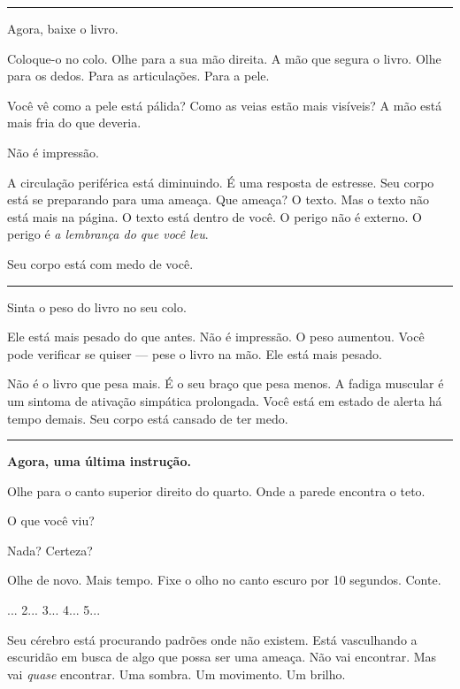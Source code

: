 \vspace{0.5em}\noindent\rule{\textwidth}{0.5pt}\vspace{0.5em}

\noindent Agora, baixe o livro.

\noindent Coloque-o no colo. Olhe para a sua mão direita. A mão que segura o livro. Olhe para os dedos. Para as articulações. Para a pele.

\noindent Você vê como a pele está pálida? Como as veias estão mais visíveis? A mão está mais fria do que deveria.

\noindent Não é impressão.

\noindent A circulação periférica está diminuindo. É uma resposta de estresse. Seu corpo está se preparando para uma ameaça. Que ameaça? O texto. Mas o texto não está mais na página. O texto está dentro de você. O perigo não é externo. O perigo é \textit{a lembrança do que você leu}.

\noindent Seu corpo está com medo de você.

\vspace{0.5em}\noindent\rule{\textwidth}{0.5pt}\vspace{0.5em}

\noindent Sinta o peso do livro no seu colo.

\noindent Ele está mais pesado do que antes. Não é impressão. O peso aumentou. Você pode verificar se quiser --- pese o livro na mão. Ele está mais pesado.

\noindent Não é o livro que pesa mais.
É o seu braço que pesa menos.
A fadiga muscular é um sintoma de ativação simpática prolongada.
Você está em estado de alerta há tempo demais.
Seu corpo está cansado de ter medo.

\vspace{0.5em}\noindent\rule{\textwidth}{0.5pt}\vspace{0.5em}

\noindent \textbf{Agora, uma última instrução.}

\noindent Olhe para o canto superior direito do quarto. Onde a parede encontra o teto.

\noindent O que você viu?

\noindent Nada? Certeza?

\noindent Olhe de novo. Mais tempo. Fixe o olho no canto escuro por 10 segundos. Conte.

... 2... 3... 4... 5...

\noindent Seu cérebro está procurando padrões onde não existem. Está vasculhando a escuridão em busca de algo que possa ser uma ameaça. Não vai encontrar. Mas vai \textit{quase} encontrar. Uma sombra. Um movimento. Um brilho.

